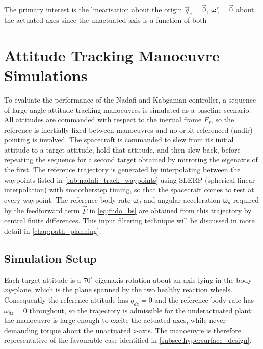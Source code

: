 The primary interest is the linearisation about the origin $\vec{q}_e = \vec{0}$, $\boldsymbol{\omega}^r_e = \vec{0}$ about the actuated axes since the unactuated axis is a function of both  


\section {Attitude Tracking Manoeuvre Simulations}
\label{subsec:nadafi_tracking_sims}
To evaluate the performance of the Nadafi and Kabganian controller, a sequence of large-angle attitude tracking manoeuvres is simulated as a baseline scenario. All attitudes are commanded with respect to the inertial frame $F_I$, so the reference is inertially fixed between manoeuvres and no orbit-referenced (nadir) pointing is involved. The spacecraft is commanded to slew from its initial attitude to a target attitude, hold that attitude, and then slew back, before repeating the sequence for a second target obtained by mirroring the eigenaxis of the first. The reference trajectory is generated by interpolating between the waypoints listed in \autoref{tab:nadafi_track_waypoints} using SLERP (spherical linear interpolation) with smootherstep timing, so that the spacecraft comes to rest at every waypoint. The reference body rate $\boldsymbol{\omega}_d$ and angular acceleration $\dot{\boldsymbol{\omega}}_d$ required by the feedforward term $\vec{F}$ in \autoref{eq:fndo_bs} are obtained from this trajectory by central finite differences. This input filtering technique will be discussed in more detail in \autoref{chap:path_planning}.

\subsection{Simulation Setup}
Each target attitude is a $70^\circ$ eigenaxis rotation about an axis lying in the body $xy$-plane, which is the plane spanned by the two healthy reaction wheels. Consequently the reference attitude has $q_{dz} = 0$ and the reference body rate has $\omega_{dz} = 0$ throughout, so the trajectory is admissible for the underactuated plant: the manoeuvre is large enough to excite the actuated axes, while never demanding torque about the unactuated $z$-axis. The manoeuvre is therefore representative of the favourable case identified in \autoref{subsec:hypersurface_design}.

